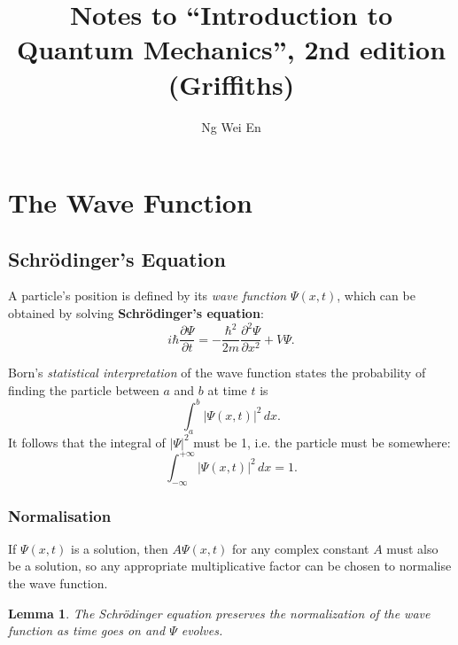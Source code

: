 \documentclass{article}
\title{Notes to ``Introduction to Quantum Mechanics'', 2nd edition (Griffiths)}
\author{Ng Wei En}
\newtheorem*{lemma*}{Lemma}
\begin{document}
\maketitle

\section{The Wave Function}

\subsection{Schr\"{o}dinger's Equation}

A particle's position is defined by its \emph{wave function} $\Psi(x, t)$,
which can be obtained by solving \textbf{Schr\"{o}dinger's equation}:
\begin{equation} \label{eq:sch-eqn}
  \boxed{
    i\hbar \frac{\partial \Psi}{\partial t}
    = -\frac{\hbar^2}{2m} \frac{\partial^2 \Psi}{\partial x^2} + V\Psi.
  }
\end{equation}

Born's \emph{statistical interpretation} of the wave function states the
probability of finding the particle between $a$ and $b$ at time $t$ is \[
  \int_a^b |\Psi(x, t)|^2 \,dx.
\] It follows that the integral of $|\Psi|^2$
must be 1, i.e. the particle must be somewhere:
\begin{equation} \label{eq:sch-prob}
  \boxed{
    \int_{-\infty}^{+\infty} |\Psi(x, t)|^2 \,dx = 1.
  }
\end{equation}

\subsubsection{Normalisation}

If $\Psi(x, t)$ is a solution, then $A \Psi(x, t)$ for any complex constant $A$
must also be a solution, so any appropriate multiplicative factor can be chosen
to normalise the wave function.

\begin{lemma*}
  The Schr\"{o}dinger equation preserves the normalization of the wave function
  as time goes on and $\Psi$ evolves.
\end{lemma*}
\end{document}

